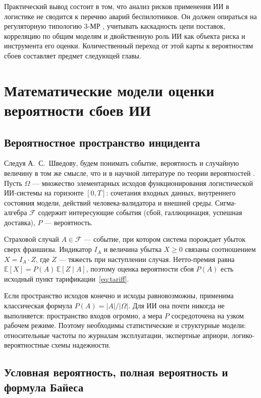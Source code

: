 \documentclass[a4paper,14pt]{extarticle}
\begin{document}
Практический вывод состоит в том, что анализ рисков применения ИИ в логистике не сводится к перечню аварий беспилотников. Он должен опираться на регуляторную типологию 3-МР \cite{cbr}, учитывать каскадность цепи поставок, корреляцию по общим моделям и двойственную роль ИИ как объекта риска и инструмента его оценки. Количественный переход от этой карты к вероятностям сбоев составляет предмет следующей главы.

\section{Математические модели оценки вероятности сбоев ИИ}

\subsection{Вероятностное пространство инцидента}

Следуя А.~С.~Шведову, будем понимать событие, вероятность и случайную величину в том же смысле, что и в научной литературе по теории вероятностей \cite{shvedov}. Пусть $\Omega$ --- множество элементарных исходов функционирования логистической ИИ-системы на горизонте $[0,T]$: сочетания входных данных, внутреннего состояния модели, действий человека-валидатора и внешней среды. Сигма-алгебра $\mathcal{F}$ содержит интересующие события (сбой, галлюцинация, успешная доставка), $P$ --- вероятность.

Страховой случай $A\in\mathcal{F}$ --- событие, при котором система порождает убыток сверх франшизы. Индикатор $I_A$ и величина убытка $X\ge 0$ связаны соотношением $X=I_A\cdot Z$, где $Z$ --- тяжесть при наступлении случая. Нетто-премия равна $\mathbb{E}[X]=P(A)\,\mathbb{E}[Z\mid A]$, поэтому оценка вероятности сбоя $P(A)$ есть исходный пункт тарификации~\eqref{eq:tariff}.

Если пространство исходов конечно и исходы равновозможны, применима классическая формула $P(A)=|A|/|\Omega|$. Для ИИ она почти никогда не выполняется: пространство входов огромно, а мера $P$ сосредоточена на узком рабочем режиме. Поэтому необходимы статистические и структурные модели: относительные частоты по журналам эксплуатации, экспертные априори, логико-вероятностные схемы надежности.

\subsection{Условная вероятность, полная вероятность и формула Байеса}
\end{document}

